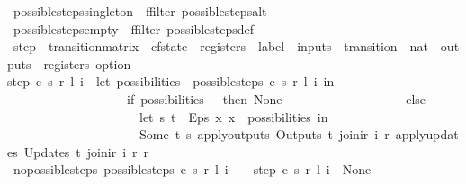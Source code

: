 \begin{isabellebody}
\isamarkupfalse%
\ possible{\isacharunderscore}steps{\isacharunderscore}singleton\ {\isacharequal}\ ffilter\ possible{\isacharunderscore}steps{\isacharunderscore}alt\isanewline
{}\isamarkupfalse%
\ possible{\isacharunderscore}steps{\isacharunderscore}empty\ {\isacharequal}\ ffilter\ possible{\isacharunderscore}steps{\isacharunderscore}def\isanewline
\isanewline
{}\isamarkupfalse%
\ step\ {\isacharcolon}{\isacharcolon}\ {\isachardoublequoteopen}transition{\isacharunderscore}matrix\ {\isasymRightarrow}\ cfstate\ {\isasymRightarrow}\ registers\ {\isasymRightarrow}\ label\ {\isasymRightarrow}\ inputs\ {\isasymRightarrow}\ {\isacharparenleft}transition\ {\isasymtimes}\ nat\ {\isasymtimes}\ outputs\ {\isasymtimes}\ registers{\isacharparenright}\ option{\isachardoublequoteclose}\ \isanewline
{\isachardoublequoteopen}step\ e\ s\ r\ l\ i\ {\isacharequal}\ {\isacharparenleft}let\ possibilities\ {\isacharequal}\ possible{\isacharunderscore}steps\ e\ s\ r\ l\ i\ in\isanewline
\ \ \ \ \ \ \ \ \ \ \ \ \ \ \ \ \ \ \ if\ possibilities\ {\isacharequal}\ {\isacharbraceleft}{\isacharbar}{\isacharbar}{\isacharbraceright}\ then\ None\isanewline
\ \ \ \ \ \ \ \ \ \ \ \ \ \ \ \ \ \ \ else\isanewline
\ \ \ \ \ \ \ \ \ \ \ \ \ \ \ \ \ \ \ \ \ let\ {\isacharparenleft}s{\isacharprime}{\isacharcomma}\ t{\isacharparenright}\ {\isacharequal}\ Eps\ {\isacharparenleft}{\isasymlambda}x{\isachardot}\ x\ {\isacharbar}{\isasymin}{\isacharbar}\ possibilities{\isacharparenright}\ in\isanewline
\ \ \ \ \ \ \ \ \ \ \ \ \ \ \ \ \ \ \ \ \ Some\ {\isacharparenleft}t{\isacharcomma}\ s{\isacharprime}{\isacharcomma}\ {\isacharparenleft}apply{\isacharunderscore}outputs\ {\isacharparenleft}Outputs\ t{\isacharparenright}\ {\isacharparenleft}join{\isacharunderscore}ir\ i\ r{\isacharparenright}{\isacharparenright}{\isacharcomma}\ {\isacharparenleft}apply{\isacharunderscore}updates\ {\isacharparenleft}Updates\ t{\isacharparenright}\ {\isacharparenleft}join{\isacharunderscore}ir\ i\ r{\isacharparenright}\ r{\isacharparenright}{\isacharparenright}\isanewline
\ \ \ \ \ \ \ \ \ \ \ \ \ \ \ \ \ \ {\isacharparenright}{\isachardoublequoteclose}\isanewline
\isanewline
{}\isamarkupfalse%
\ no{\isacharunderscore}possible{\isacharunderscore}steps{\isacharcolon}\ {\isachardoublequoteopen}possible{\isacharunderscore}steps\ e\ s\ r\ l\ i\ {\isacharequal}\ {\isacharbraceleft}{\isacharbar}{\isacharbar}{\isacharbraceright}\ {\isasymLongrightarrow}\ step\ e\ s\ r\ l\ i\ {\isacharequal}\ None{\isachardoublequoteclose}\isanewline
%
\isadelimproof

\end{isabellebody}
